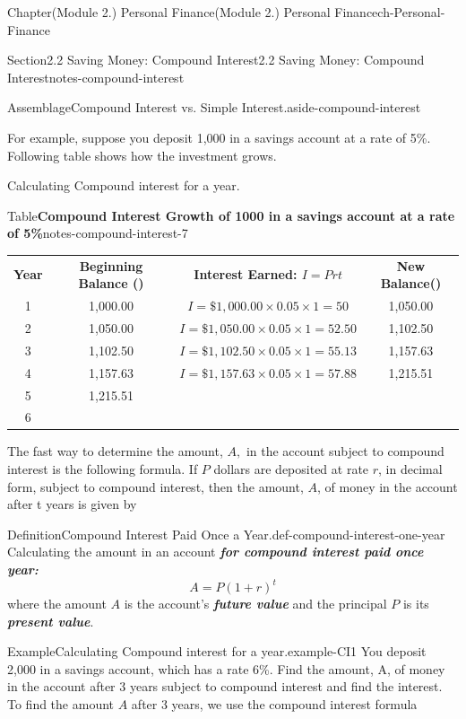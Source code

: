 \documentclass[oneside,10pt,]{book}
\newcommand{\tabularfont}{\relax}
\newcommand{\alert}[1]{\textbf{\textit{#1}}}
\newcommand{\hrulethin}  {\noalign{\hrule height 0.04em}}
\begin{document}
\begin{chapterptx}{Chapter}{(Module 2.) Personal Finance}{}{(Module 2.) Personal Finance}{}{}{ch-Personal-Finance}
\begin{sectionptx}{Section}{2.2 Saving Money: Compound Interest}{}{2.2 Saving Money: Compound Interest}{}{}{notes-compound-interest}
\begin{assemblage}{Assemblage}{Compound Interest vs. Simple Interest.}{aside-compound-interest}
\end{assemblage}
For example, suppose you deposit \textdollar{}1,000 in a savings account at a rate of 5\%. Following table shows how the investment grows.%
\par
Calculating Compound interest for a year.%
\begin{tableptx}{Table}{\textbf{Compound Interest Growth of \textdollar{}1000 in a savings account at a rate of 5\%}}{notes-compound-interest-7}{}%
\centering%
{\tabularfont%
\begin{tabular}{cccc}
{\bfseries{}Year}&{\bfseries{}Beginning Balance (\textdollar{})}&{\bfseries{}Interest Earned: \(I=Prt\)}&{\bfseries{}New Balance(\textdollar{})}\tabularnewline\hrulethin
1&\textdollar{}1,000.00&\(I=\$ 1,000.00 \times 0.05\times 1=50\)&\textdollar{}1,050.00\tabularnewline[0pt]
2&\textdollar{}1,050.00&\(I=\$ 1,050.00 \times 0.05\times 1=52.50\)&\textdollar{}1,102.50\tabularnewline[0pt]
3&\textdollar{}1,102.50&\(I=\$ 1,102.50 \times 0.05\times 1=55.13\)&\textdollar{}1,157.63\tabularnewline[0pt]
4&\textdollar{}1,157.63&\(I=\$ 1,157.63 \times 0.05\times 1=57.88\)&\textdollar{}1,215.51\tabularnewline[0pt]
5&\textdollar{}1,215.51&&\tabularnewline[0pt]
6&&&
\end{tabular}
}%
\end{tableptx}%
The fast way to determine the amount, \(A,\) in the account subject to compound interest is the following formula. If \(P\) dollars are deposited at rate \(r\), in decimal form, subject to compound interest, then the amount, \(A\), of money in the account after t years is given by%
\begin{definition}{Definition}{Compound Interest Paid Once a Year.}{def-compound-interest-one-year}%
Calculating the amount in an account \alert{for compound interest paid once year:}%
\begin{equation*}
A=P(1+r)^{t} 
\end{equation*}
where the amount \(A\) is the account's \alert{future value} and the principal \(P\) is its \alert{present value}.%
\end{definition}
\begin{example}{Example}{Calculating Compound interest for a year.}{example-CI1}%
You deposit \textdollar{}2,000 in a savings account, which has a rate 6\%. Find the amount, A, of money in the account after 3 years subject to compound interest and find the interest.%
\noindent\hypertarget{example-CI1-3}{}To find the amount \(A\) after 3 years, we use the compound interest formula%
%
\begin{equation*}

\end{equation*}
\end{example}
\end{sectionptx}
\end{chapterptx}
\end{document}
